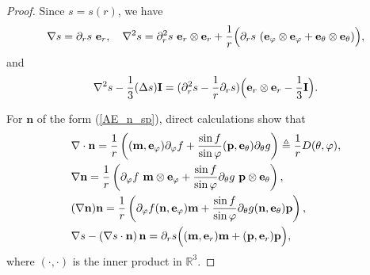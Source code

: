 \documentclass[10pt, a4paper]{article}
\newcommand\n{\mathbf{n}}
\newcommand\e{\mathbf{e}}
\newcommand\m{\mathbf{m}}
\newcommand\p{\mathbf{p}}
\newcommand\pp{\partial}
\begin{document}
\begin{proof}
Since $s = s(r)$, we have
\begin{equation}
 \nabla s = \pp_rs ~ \e_r,  \quad  \nabla^2 s = \pp_r^2 s ~ \e_r \otimes \e_r + \frac{1}{r} \Bigl( \pp_r s ~ (\e_{\varphi} \otimes \e_{\varphi} + \e_{\theta} \otimes \e_{\theta}) \Bigr),
\end{equation}
and
\begin{equation}\label{dds}
\nabla^2 s  - \frac{1}{3}(\Delta s) \mathbf{I} = (\pp_r^2 s - \frac{1}{r} \pp_r s) \Bigl( \e_r \otimes \e_r - \frac{1}{3} \mathbf{I} \Bigr). 
\end{equation}

For $\n$ of the form (\ref{AE_n_sp}), direct calculations show that
\begin{equation}\label{Cal_sn1}
\begin{aligned}
& \nabla \cdot \n  = \frac{1}{r} \left( (\m, \e_{\varphi}) \pp_{\varphi} f + \frac{\sin f}{\sin \varphi} (\p, \e _{\theta}) \pp_{\theta} g \right) \triangleq \frac{1}{r} D(\theta, \varphi), \\
& \nabla \n = \frac{1}{r} \left(  \partial_{\varphi} f ~ \m \otimes \e_{\varphi} + \frac{\sin f}{\sin \varphi}   \partial_{\theta} g ~ \p \otimes \e_{\theta} \right),  \\
& (\nabla \n) \n  = \frac{1}{r} \left( \pp_{\varphi} f (\n, \e_{\varphi}) \m + \frac{\sin f}{ \sin \varphi} \pp_{\theta} g  (\n, \e_{\theta}) \p \right), \\
& \nabla s - \left( \nabla s \cdot \n \right) \n  =  \pp_r s \Bigl( (\m, \e_r) \m + (\p, \e_r) \p \Bigr), \\ 
\end{aligned}
\end{equation}
where $(\cdot, \cdot)$ is the inner product in $\mathbb{R}^3$.


\end{proof}
\end{document}
